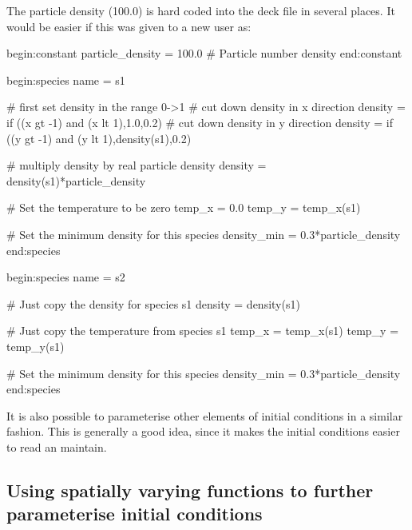The particle density (100.0) is hard coded into the deck file in several
places. It would be easier if this was given to a new user as:
\begin{boxverbatim}
begin:constant
   particle_density = 100.0 # Particle number density
end:constant

begin:species
   name = s1

   # first set density in the range 0->1
   # cut down density in x direction
   density = if ((x gt -1) and (x lt 1),1.0,0.2)
   # cut down density in y direction
   density = if ((y gt -1) and (y lt 1),density(s1),0.2)

   # multiply density by real particle density
   density = density(s1)*particle_density

   # Set the temperature to be zero
   temp_x = 0.0
   temp_y = temp_x(s1)

   # Set the minimum density for this species
   density_min = 0.3*particle_density
end:species

begin:species
   name = s2

   # Just copy the density for species s1
   density = density(s1)

   # Just copy the temperature from species s1
   temp_x = temp_x(s1)
   temp_y = temp_y(s1)

   # Set the minimum density for this species
   density_min = 0.3*particle_density
end:species
\end{boxverbatim}

It is also possible to parameterise other elements of initial conditions in a
similar fashion. This is generally a good idea, since it makes the
initial conditions easier to read an maintain.

\subsection{Using spatially varying functions to further parameterise
  initial conditions}

